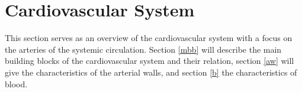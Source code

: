 \documentclass[a4paper, oneside]{discothesis}
\begin{document}








\chapter{Cardiovascular System}
This section serves as an overview of the cardiovascular system with a focus on the arteries of the systemic circulation. 
Section \ref{mbb} will describe the main building blocks of the cardiovascular system and their relation, section \ref{aw} will give the characteristics of the arterial walls, and section \ref{b} the characteristics of blood.
\end{document}
